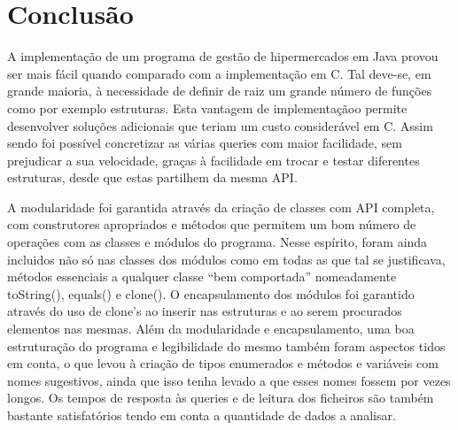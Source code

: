 \chapter{Conclusão}

A implementação de um programa de gestão de hipermercados em Java provou ser mais fácil
quando comparado com a implementação em C. Tal deve-se, em grande maioria, à necessidade de definir de raiz um grande número de funções como por exemplo estruturas. Esta vantagem de implementaçãoo permite desenvolver soluções adicionais que teriam um custo considerável em C.
Assim sendo foi possível concretizar as várias queries com maior facilidade, sem prejudicar a sua velocidade, graças à facilidade em trocar e testar diferentes estruturas, desde que estas partilhem da mesma API.

A modularidade foi garantida através da criação de classes com API completa, com construtores apropriados e métodos que permitem um bom número de operações com as classes e módulos do programa. Nesse espírito, foram ainda incluidos não só nas classes dos módulos como em todas as que tal se justificava, métodos essenciais a qualquer classe “bem comportada” nomeadamente toString(), equals() e clone().
O encapsulamento dos módulos foi garantido através do uso de clone’s ao inserir nas estruturas e ao serem procurados elementos nas mesmas.
Além da modularidade e encapsulamento, uma boa estruturação do programa e legibilidade do mesmo também foram aspectos tidos em conta, o que levou à criação de tipos enumerados e métodos e variáveis com nomes sugestivos, ainda que isso tenha levado a que esses nomes fossem por vezes longos.
Os tempos de resposta às queries e de leitura dos ficheiros são também bastante satisfatórios tendo em conta a quantidade de dados a analisar.

